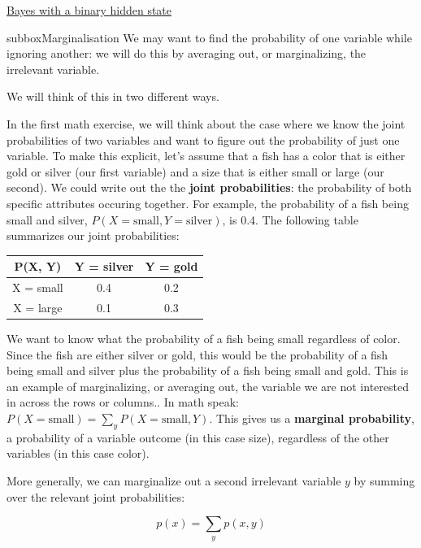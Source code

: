\begin{textbox}{\href{https://compneuro.neuromatch.io/tutorials/W3D1_BayesianDecisions/student/W3D1_Tutorial1.html}{Bayes with a binary hidden state } }
\begin{subbox}{subbox}{Marginalisation}
\scriptsize
We may want to find the probability of one variable while ignoring another: we will do this by averaging out, or marginalizing, the irrelevant variable.

We will think of this in two different ways.

In the first math exercise, we will think about the case where we know the joint probabilities of two variables and want to figure out the probability of just one variable. To make this explicit, let's assume that a fish has a color that is either gold or silver (our first variable) and a size that is either small or large (our second). We could write out the the \textbf{joint probabilities}: the probability of both specific attributes occuring together. For example, the probability of a fish being small and silver, $P(X = \textrm{small}, Y = \textrm{silver})$, is 0.4. The following table summarizes our joint probabilities:

\begin{center}
\begin{tabular}{||c c c||} 
 \hline
 P(X, Y) & Y = silver & Y = gold \\ [0.5ex] 
 \hline\hline
 X = small & 0.4 & 0.2\\ 
 \hline
 X = large & 0.1  & 0.3  \\ [1ex] 
 \hline
\end{tabular}
\end{center}
We want to know what the probability of a fish being small  regardless of color. Since the fish are either silver or gold, this would be the probability of a fish being small and silver plus the probability of a fish being small and gold. This is an example of marginalizing, or averaging out, the variable we are not interested in across the rows or columns.. In math speak: $P(X = \textrm{small}) = \sum_y{P(X = \textrm{small}, Y)}$. This gives us a \textbf{marginal probability}, a probability of a variable outcome (in this case size), regardless of the other variables (in this case color).

More generally, we can marginalize out a second irrelevant variable $y$ by summing over the relevant joint probabilities:

$$p(x) = \sum_y p(x, y) $$


\end{subbox}
\end{textbox}

